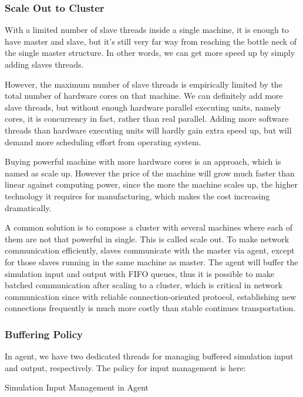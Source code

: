 \subsubsection{Scale Out to Cluster}

With a limited number of slave threads inside a single machine, it is enough to have master and slave, but it's still very far way from reaching the bottle neck of the single master structure. In other words, we can get more speed up by simply adding slaves threads.

However, the maximum number of slave threads is empirically limited by the total number of hardware cores on that machine. We can definitely add more slave threads, but without enough hardware parallel executing units, namely cores, it is concurrency in fact, rather than real parallel. Adding more software threads than hardware executing units will hardly gain extra speed up, but will demand more scheduling effort from operating system.

Buying powerful machine with more hardware cores is an approach, which is named as scale up. However the price of the machine will grow much faster than linear against computing power, since the more the machine scales up, the higher technology it requires for manufacturing, which makes the cost increasing dramatically.

A common solution is to compose a cluster with several machines where each of them are not that powerful in single. This is called scale out. To make network communication efficiently, slaves communicate with the master via agent, except for those slaves running in the same machine as master. The agent will buffer the simulation input and output with FIFO queues, thus it is possible to make batched communication after scaling to a cluster, which is critical in network communication since with reliable connection-oriented protocol, establishing new connections frequently is much more costly than stable continues transportation.

\subsubsection{Buffering Policy}

In agent, we have two dedicated threads for managing buffered simulation input and output, respectively. The policy for input management is here:

\begin{algorithm}
\begin{algorithmic}[1]
    \EndFor
  \Else
  \EndIf
\EndWhile
\end{algorithmic}
\caption{Simulation Input Management in Agent}
\label{input_buf_alg}
\end{algorithm}

